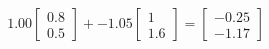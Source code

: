 \documentclass[preview]{standalone}
\begin{document}
\begin{align*}
1.00 \begin{bmatrix} 0.8 \\ 0.5 \end{bmatrix} + -1.05 \begin{bmatrix} 1 \\ 1.6 \end{bmatrix} = \begin{bmatrix} -0.25 \\ -1.17 \end{bmatrix}
\end{align*}
\end{document}
